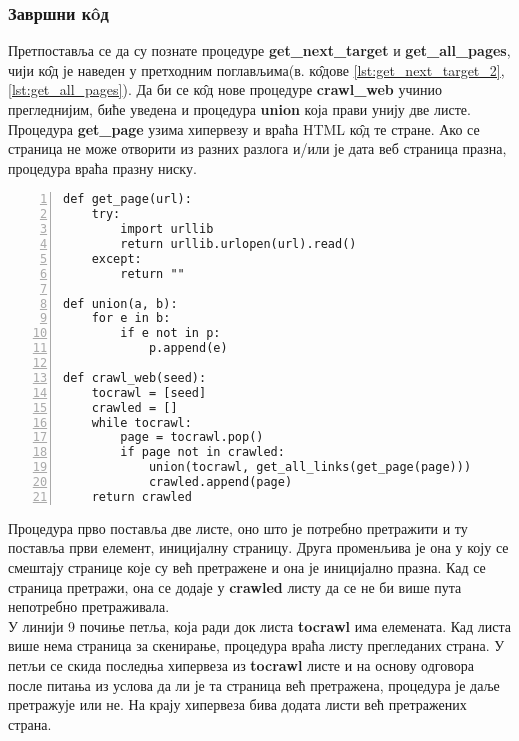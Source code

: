 		\subsubsection{Завршни к\^oд}
		Претпоставља се да су познате процедуре \textbf{get\_next\_target} и \textbf{get\_all\_pages}, чији к\^{о}д је наведен у претходним поглављима(в. к\^{о}дове \ref{lst:get_next_target_2}, \ref{lst:get_all_pages}). Да би се к\^{о}д нове процедуре \textbf{crawl\_web} учинио прегледнијим, биће уведена и процедура \textbf{union} која прави унију две листе. Процедура \textbf{get\_page}  узима хипервезу и враћа HTML к\^{о}д те стране. Ако се страница не може отворити из разних разлога и/или је дата веб страница празна, процедура враћа празну ниску.  
		\begin{lstlisting}[caption=Веб паук, label={lst:crawlweb1}, numbers=left]
def get_page(url):
    try:
        import urllib
        return urllib.urlopen(url).read()
    except:
        return ""
     
def union(a, b):
    for e in b:
        if e not in p:
            p.append(e)

def crawl_web(seed):
    tocrawl = [seed]
    crawled = []
    while tocrawl:
        page = tocrawl.pop()
        if page not in crawled:
            union(tocrawl, get_all_links(get_page(page)))
            crawled.append(page)
    return crawled
		\end{lstlisting}
		Процедура прво поставља две листе, оно што је потребно претражити и ту поставља први елемент, иницијалну страницу. Друга променљива је она у коју се смештају странице које су већ претражене и она је иницијално празна. Кад се страница претражи, она се додаје у \textbf{crawled} листу да се не би више пута непотребно претраживала.\\
		  У линији 9 почиње петља, која ради док листа \textbf{tocrawl} има елемената. Кад листа више нема страница за скенирање, процедура враћа листу прегледаних страна. У петљи се скида последња хипервеза из \textbf{tocrawl} листе и на основу одговора после питања из услова да ли је та страница већ претражена, процедура је даље претражује или не. На крају хипервеза бива додата листи већ претражених страна. 
